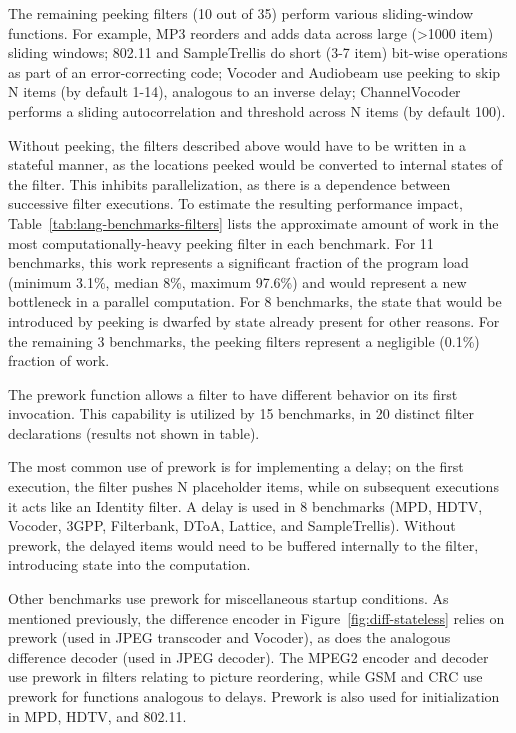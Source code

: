 The remaining peeking filters (10 out of 35) perform various
sliding-window functions.  For example, MP3 reorders and adds data
across large (>1000 item) sliding windows;
802.11 and SampleTrellis do short (3-7 item) bit-wise operations as
part of an error-correcting code; Vocoder and Audiobeam use peeking to
skip N items (by default 1-14), analogous to an inverse delay;
ChannelVocoder performs a sliding autocorrelation and threshold across
N items (by default 100).

Without peeking, the filters described above would have to be written
in a stateful manner, as the locations peeked would be converted to
internal states of the filter.  This inhibits parallelization, as
there is a dependence between successive filter executions.  To
estimate the resulting performance impact,
Table~\ref{tab:lang-benchmarks-filters} lists the approximate amount
of work in the most computationally-heavy peeking filter in each
benchmark.  For 11 benchmarks, this work represents a significant
fraction of the program load (minimum 3.1\%, median 8\%, maximum
97.6\%) and would represent a new bottleneck in a parallel
computation.  For 8 benchmarks, the state that would be introduced by
peeking is dwarfed by state already present for other reasons.  For
the remaining 3 benchmarks, the peeking filters represent a negligible
(0.1\%) fraction of work.

  The prework
function allows a filter to have different behavior on its first
invocation.  This capability is utilized by 15 benchmarks, in 20
distinct filter declarations (results not shown in table).

The most common use of prework is for implementing a delay; on the
first execution, the filter pushes N placeholder items, while on
subsequent executions it acts like an Identity filter.  A delay is
used in 8 benchmarks (MPD, HDTV, Vocoder, 3GPP, Filterbank, DToA,
Lattice, and SampleTrellis).  Without prework, the delayed items would
need to be buffered internally to the filter, introducing state into
the computation.

Other benchmarks use prework for miscellaneous startup conditions.  As
mentioned previously, the difference encoder in
Figure~\ref{fig:diff-stateless} relies on prework (used in JPEG
transcoder and Vocoder), as does the analogous difference decoder
(used in JPEG decoder).  The MPEG2 encoder and decoder use prework in
filters relating to picture reordering, while GSM and CRC use prework
for functions analogous to delays.  Prework is also used for
initialization in MPD, HDTV, and 802.11.

